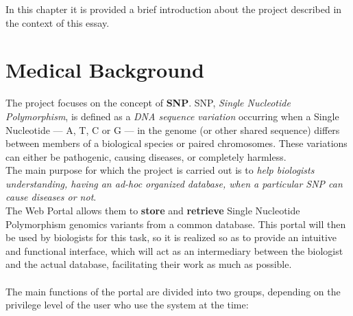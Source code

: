 In this chapter it is provided a brief introduction about the project described in the context of this essay.
\section{Medical Background}
The project focuses on the concept of \textbf{SNP}. SNP, \emph{Single Nucleotide Polymorphism}, is defined as a \emph{DNA sequence variation} occurring when a Single Nucleotide — A, T, C or G — in the genome (or other shared sequence) differs between members of a biological species or paired chromosomes. These variations can either be pathogenic, causing diseases, or completely harmless.
\\The main purpose for which the project is carried out is to \emph{help biologists understanding, having an ad-hoc organized database, when a particular SNP can cause diseases or not}.
\\The Web Portal allows them to \textbf{store} and \textbf{retrieve} Single Nucleotide Polymorphism genomics variants from a common database. This portal will then be used by biologists for this task, so it is realized so as to provide an intuitive and functional interface, which will act as an intermediary between the biologist and the actual database, facilitating their work as much as possible.
\\
\\The main functions of the portal are divided into two groups, depending on the privilege level of the user who use the system at the time:
